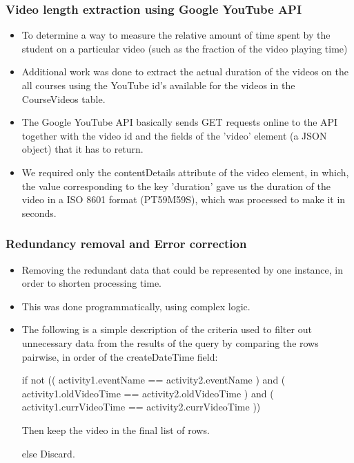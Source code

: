 \documentclass[12pt,xcolor=dvipsnames]{beamer}
\begin{document}
\begin{frame}[t]
\frametitle{Video length extraction using Google YouTube API}

\begin{itemize}
\item To determine a way to measure the relative amount of time spent by the student on a particular video (such as the fraction of the video playing time)

\item Additional work was done to extract the actual duration of the videos on the all courses using the YouTube id's available for the videos in the CourseVideos table.

\item The Google YouTube API basically sends GET requests online to the API together with the video id and the fields of the 'video' element (a JSON object) that it has to return.

\item We required only the contentDetails attribute of the video element, in which, the value corresponding to the key 'duration' gave us the duration of the video in a ISO 8601 format (PT59M59S), which was processed to make it in seconds.

\end{itemize}

\end{frame}

\begin{frame}[t]
\frametitle{Redundancy removal and Error correction}

\begin{itemize}
\item Removing the redundant data that could be represented by one instance, in order to shorten processing time.
\item This was done programmatically, using complex logic.
\item The following is a simple description of the criteria used to filter out unnecessary data from the results of the query by comparing the rows pairwise, in order of the createDateTime field:


if not (( activity1.eventName == activity2.eventName ) and 	( activity1.oldVideoTime == activity2.oldVideoTime ) and 	( activity1.currVideoTime == activity2.currVideoTime ))

		Then keep the video in the final list of rows.

else Discard.


\end{itemize}

\end{frame}
\end{document}
